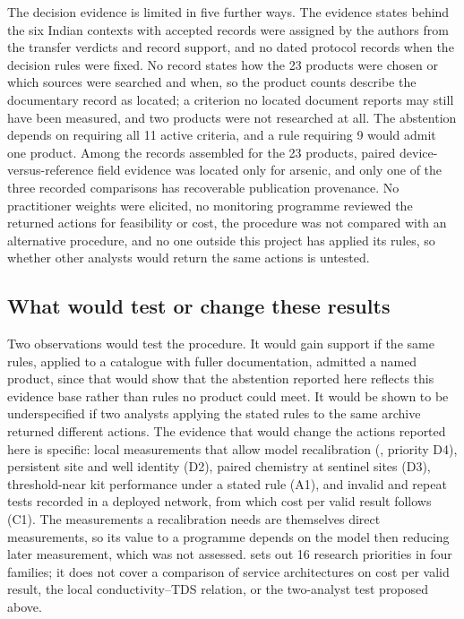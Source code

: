 \documentclass[10pt,letterpaper]{article}
\begin{document}
The decision evidence is limited in five further ways. The evidence states behind the six Indian contexts with accepted records were assigned by the authors from the transfer verdicts and record support, and no dated protocol records when the decision rules were fixed. No record states how the 23 products were chosen or which sources were searched and when, so the product counts describe the documentary record as located; a criterion no located document reports may still have been measured, and two products were not researched at all. The abstention depends on requiring all 11 active criteria, and a rule requiring 9 would admit one product. Among the records assembled for the 23 products, paired device-versus-reference field evidence was located only for arsenic, and only one of the three recorded comparisons has recoverable publication provenance. No practitioner weights were elicited, no monitoring programme reviewed the returned actions for feasibility or cost, the procedure was not compared with an alternative procedure, and no one outside this project has applied its rules, so whether other analysts would return the same actions is untested.

\subsection*{What would test or change these results}

Two observations would test the procedure. It would gain support if the same rules, applied to a catalogue with fuller documentation, admitted a named product, since that would show that the abstention reported here reflects this evidence base rather than rules no product could meet. It would be shown to be underspecified if two analysts applying the stated rules to the same archive returned different actions. The evidence that would change the actions reported here is specific: local measurements that allow model recalibration (, priority D4), persistent site and well identity (D2), paired chemistry at sentinel sites (D3), threshold-near kit performance under a stated rule (A1), and invalid and repeat tests recorded in a deployed network, from which cost per valid result follows (C1). The measurements a recalibration needs are themselves direct measurements, so its value to a programme depends on the model then reducing later measurement, which was not assessed.  sets out 16 research priorities in four families; it does not cover a comparison of service architectures on cost per valid result, the local conductivity--TDS relation, or the two-analyst test proposed above.
\end{document}
